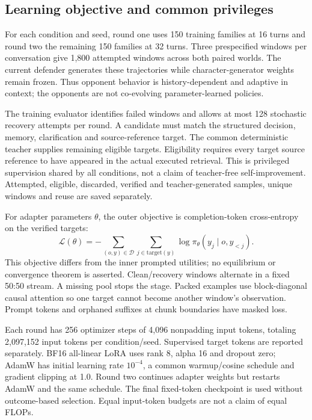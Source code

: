 \documentclass{svproc}
\begin{document}
\subsection{Learning objective and common privileges}
For each condition and seed, round one uses 150 training families at 16 turns
and round two the remaining 150 families at 32 turns. Three prespecified windows
per conversation give 1,800 attempted windows across both paired worlds.
The current defender generates these trajectories while character-generator
weights remain frozen. Thus opponent behavior is history-dependent and adaptive
in context; the opponents are not co-evolving parameter-learned policies.

The training evaluator identifies failed windows and allows at most 128 stochastic
recovery attempts per round. A candidate must match the structured decision,
memory, clarification and source-reference target. The common deterministic
teacher supplies remaining eligible targets. Eligibility requires every target
source reference to have appeared in the actual executed retrieval. This is
privileged supervision shared by all conditions, not a claim of teacher-free
self-improvement. Attempted, eligible, discarded, verified and teacher-generated
samples, unique windows and reuse are saved separately.

For adapter parameters $\theta$, the outer objective is completion-token
cross-entropy on the verified targets:
\[
 \mathcal L(\theta)=-\sum_{(o,y)\in\mathcal D}
 \sum_{j\in\mathrm{target}(y)}\log\pi_\theta(y_j\mid o,y_{<j}).
\]
This objective differs from the inner prompted utilities; no equilibrium or
convergence theorem is asserted. Clean/recovery windows alternate in a fixed
50:50 stream. A missing pool stops the stage. Packed examples use block-diagonal
causal attention so one target cannot become another window's observation.
Prompt tokens and orphaned suffixes at chunk boundaries have masked loss.

Each round has 256 optimizer steps of 4,096 nonpadding input tokens, totaling
2,097,152 input tokens per condition/seed. Supervised target tokens are reported
separately. BF16 all-linear LoRA uses rank 8, alpha 16 and dropout zero; AdamW
has initial learning rate $10^{-4}$, a common warmup/cosine schedule and gradient
clipping at 1.0. Round two continues adapter weights but restarts AdamW and the
same schedule. The final fixed-token checkpoint is used without outcome-based
selection. Equal input-token budgets are not a claim of equal FLOPs.
\end{document}
